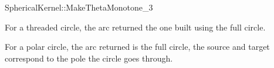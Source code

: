 {\begin{ccRefFunctionObjectConcept}{SphericalKernel::MakeThetaMonotone_3}
{For a threaded circle, the arc returned the one built using the full circle.

For a polar circle, the arc returned is the full circle, the source and target correspond to the pole the circle goes through.
}

\ccSeeAlso


\end{ccRefFunctionObjectConcept}
}%




